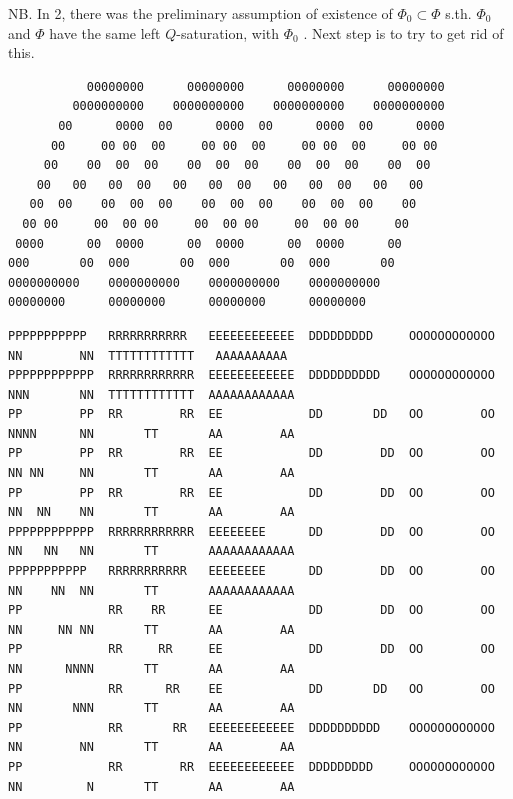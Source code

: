 NB. In 2,  there was the preliminary assumption of existence of $\Phi_0\subset\Phi$ s.th. $\Phi_0$ and $\Phi$ have the same left $Q$-saturation, with $\Phi_0$ . Next step is to try to get rid of this.


{\fontsize{4.1pt}{4.8pt}\selectfont
\begin{verbatim}
           00000000      00000000      00000000      00000000
         0000000000    0000000000    0000000000    0000000000
       00      0000  00      0000  00      0000  00      0000
      00     00 00  00     00 00  00     00 00  00     00 00
     00    00  00  00    00  00  00    00  00  00    00  00
    00   00   00  00   00   00  00   00   00  00   00   00
   00  00    00  00  00    00  00  00    00  00  00    00
  00 00     00  00 00     00  00 00     00  00 00     00
 0000      00  0000      00  0000      00  0000      00
000       00  000       00  000       00  000       00
0000000000    0000000000    0000000000    0000000000
00000000      00000000      00000000      00000000
\end{verbatim}
}

{\fontsize{4.1pt}{4.8pt}\selectfont
\begin{verbatim}
PPPPPPPPPPP   RRRRRRRRRRR   EEEEEEEEEEEE  DDDDDDDDD     OOOOOOOOOOOO  NN        NN  TTTTTTTTTTTT   AAAAAAAAAA
PPPPPPPPPPPP  RRRRRRRRRRRR  EEEEEEEEEEEE  DDDDDDDDDD    OOOOOOOOOOOO  NNN       NN  TTTTTTTTTTTT  AAAAAAAAAAAA
PP        PP  RR        RR  EE            DD       DD   OO        OO  NNNN      NN       TT       AA        AA
PP        PP  RR        RR  EE            DD        DD  OO        OO  NN NN     NN       TT       AA        AA
PP        PP  RR        RR  EE            DD        DD  OO        OO  NN  NN    NN       TT       AA        AA
PPPPPPPPPPPP  RRRRRRRRRRRR  EEEEEEEE      DD        DD  OO        OO  NN   NN   NN       TT       AAAAAAAAAAAA
PPPPPPPPPPP   RRRRRRRRRRR   EEEEEEEE      DD        DD  OO        OO  NN    NN  NN       TT       AAAAAAAAAAAA
PP            RR    RR      EE            DD        DD  OO        OO  NN     NN NN       TT       AA        AA
PP            RR     RR     EE            DD        DD  OO        OO  NN      NNNN       TT       AA        AA
PP            RR      RR    EE            DD       DD   OO        OO  NN       NNN       TT       AA        AA
PP            RR       RR   EEEEEEEEEEEE  DDDDDDDDDD    OOOOOOOOOOOO  NN        NN       TT       AA        AA
PP            RR        RR  EEEEEEEEEEEE  DDDDDDDDD     OOOOOOOOOOOO  NN         N       TT       AA        AA
\end{verbatim}
}

